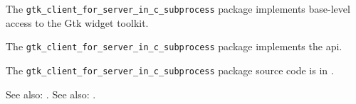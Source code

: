 
The {\tt gtk\_client\_for\_server\_in\_c\_subprocess} package implements base-level access to the Gtk widget 
toolkit.

The {\tt gtk\_client\_for\_server\_in\_c\_subprocess} package implements the  api.

The {\tt gtk\_client\_for\_server\_in\_c\_subprocess} package source code is in .

See also:  .
See also:  .


